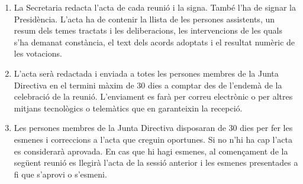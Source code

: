 \documentclass[11pt,a4paper]{article}
\newcommand{\JD}{Junta Directiva\xspace}
\begin{document}
\begin{enumerate}
    \item La Secretaria redacta l'acta de cada reunió i la signa. També l'ha de signar la Presidència. L'acta ha de contenir la llista de les persones assistents, un resum dels temes tractats i les deliberacions, les intervencions de les quals s'ha demanat constància, el text dels acords adoptats i el resultat numèric de les votacions.
    \item L'acta serà redactada i enviada a totes les persones membres de la \JD en el termini màxim de 30 dies a comptar des de l'endemà de la celebració de la reunió. L'enviament es farà per correu electrònic o per altres mitjans tecnològics o telemàtics que en garanteixin la recepció.
    \item Les persones membres de la \JD disposaran de 30 dies per fer les esmenes i correccions a l'acta que creguin oportunes. Si no n'hi ha cap l'acta es considerarà aprovada. En cas que hi hagi esmenes, al començament de la següent reunió es llegirà l'acta de la sessió anterior i les esmenes presentades a fi que s'aprovi o s'esmeni.
\end{enumerate}
\end{document}
